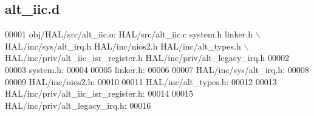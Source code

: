 \subsection{alt\+\_\+iic.\+d}
\label{alt__iic_8d_source}

\begin{DoxyCode}
00001 obj/HAL/src/alt\_iic.o: HAL/src/alt\_iic.c system.h linker.h \(\backslash\)
 HAL/inc/sys/alt_irq.h HAL/inc/nios2.h HAL/inc/alt\_types.h \(\backslash\)
 HAL/inc/priv/alt_iic_isr_register.h HAL/inc/priv/alt\_legacy\_irq.h
00002 
00003 system.h:
00004 
00005 linker.h:
00006 
00007 HAL/inc/sys/alt_irq.h:
00008 
00009 HAL/inc/nios2.h:
00010 
00011 HAL/inc/alt\_types.h:
00012 
00013 HAL/inc/priv/alt_iic_isr_register.h:
00014 
00015 HAL/inc/priv/alt\_legacy\_irq.h:
00016 \end{DoxyCode}
